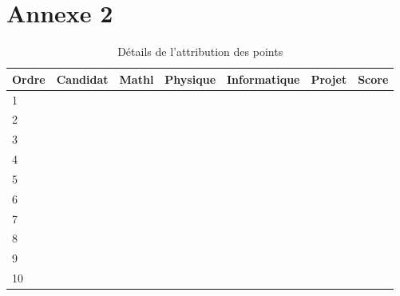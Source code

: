 \chapter*{Annexe 2}


\begin{table}
\begin{center}
\begin{tabular}{|l|l|l|l|l|l|l|}
\hline
\rowcolor[gray]{0.8}\bfseries Ordre & \bfseries Candidat& \bfseries Mathl& \bfseries Physique & \bfseries Informatique  & \bfseries Projet & \bfseries Score\\
\hline
\hline
1& & & & & & \\
\hline 
2& & & & & & \\
\hline
3& & & & & & \\
\hline
4& & & & & & \\
\hline 
5& & & & & & \\
\hline 
6& & & & & & \\
\hline 
7& & & & & & \\
\hline 
8& & & & & & \\
\hline 
9& & & & & & \\
\hline 
10& & & & & & \\
\hline 
\end{tabular}
\end{center}
\caption{Détails de l'attribution des points}
\label{tab22}
\end{table}
